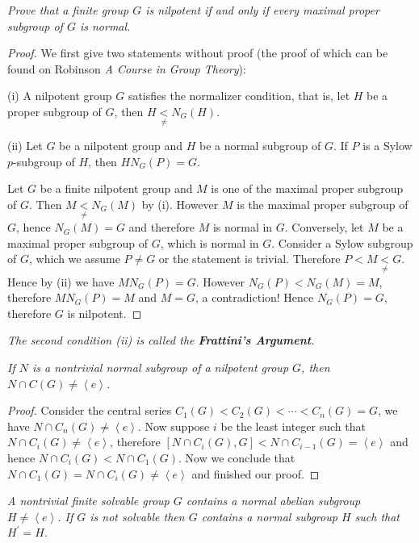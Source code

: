 \begin{problem}\em
Prove that a finite group $G$ is nilpotent if and only if every maximal proper subgroup of $G$ is normal.
\end{problem}
\begin{proof}
We first give two statements without proof (the proof of which can be found on Robinson \textit{A Course in Group Theory}):\par
(i) A nilpotent group $G$ satisfies the normalizer condition, that is, let $H$ be a proper subgroup of $G$, then $H\underset{\ne}{<}N_G\left( H \right) $.\par
(ii) Let $G$ be a nilpotent group and $H$ be a normal subgroup of $G$. If $P$ is a Sylow $p$-subgroup of $H$, then $HN_G(P)=G$.\par
Let $G$ be a finite nilpotent group and $M$ is one of the maximal proper subgroup of $G$. Then $M\underset{\ne}{<}N_G(M)$ by (i). However $M$ is the maximal proper subgroup of $G$, hence $N_G(M)=G$ and therefore $M$ is normal in $G$. Conversely, let $M$ be a maximal proper subgroup of $G$, which is normal in $G$. Consider a Sylow subgroup of $G$, which we assume $P\ne G$ or the statement is trivial. Therefore $P<M\underset{\ne}{<}G$. Hence by (ii) we have $MN_G\left( P \right) =G$. However $N_G\left( P \right) <N_G\left( M \right) =M$, therefore $MN_G\left( P \right) =M$ and $M=G$, a contradiction! Hence $N_G(P)=G$, therefore $G$ is nilpotent.
\end{proof}
\begin{note}\em
The second condition (ii) is called the \textbf{Frattini's Argument}.
\end{note}
\begin{problem}\em
If $N$ is a nontrivial normal subgroup of a nilpotent group $G$, then $N\cap C(G)\ne\left<e\right>$.
\end{problem}
\begin{proof}
Consider the central series $C_1\left( G \right) <C_2\left( G \right) <\cdots <C_n\left( G \right) =G$, we have $N\cap C_n\left( G \right) \ne \left< e \right> $. Now suppose $i$ be the least integer such that $N\cap C_i\left( G \right) \ne \left< e \right> $, therefore $\left[ N\cap C_i\left( G \right) ,G \right] <N\cap C_{i-1}\left( G \right) =\left< e \right> $ and hence $N\cap C_i\left( G \right) <N\cap C_1\left( G \right) $. Now we conclude that $N\cap C_1\left( G \right) =N\cap C_i\left( G \right) \ne \left< e \right> $ and finished our proof.
\end{proof}
\begin{problem}\em
A nontrivial finite solvable group $G$ contains a normal abelian subgroup $H\ne\left<e\right>$. If $G$ is not solvable then $G$ contains a normal subgroup $H$ such that $H^\prime=H$.
\end{problem}
